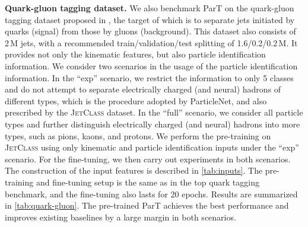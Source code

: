 \documentclass[nohyperref]{article}
\theoremstyle{plain}
\theoremstyle{definition}
\theoremstyle{remark}
\newcommand{\jetclass}{{\textsc{JetClass}}\xspace}
\begin{document}
\textbf{Quark-gluon tagging dataset.} We also benchmark ParT on the quark-gluon tagging dataset \cite{komiskePythia8QuarkGluon2019} proposed in \citet{Komiske:2018cqr}, the target of which is to separate jets initiated by quarks (signal) from those by gluons (background). This dataset also consists of 2\,M jets, with a recommended train/validation/test splitting of 1.6/0.2/0.2\,M. It provides not only the kinematic features, but also particle identification information. We consider two scenarios in the usage of the particle identification information. In the ``exp'' scenario, we restrict the information to only 5 classes and do not attempt to separate electrically charged (and neural) hadrons of different types, which is the procedure adopted by ParticleNet, and also prescribed by the \jetclass dataset. In the ``full'' scenario, we consider all particle types and further distinguish electrically charged (and neural) hadrons into more types, such as pions, kaons, and protons. 
We perform the pre-training on \jetclass using only kinematic and particle identification inputs under the ``exp'' scenario. For the fine-tuning, we then carry out experiments in both scenarios. The construction of the input features is described in \cref{tab:inputs}. 
The pre-training and fine-tuning setup is the same as in the top quark tagging benchmark, and the fine-tuning also lasts for 20 epochs. Results are summarized in \cref{tab:quark-gluon}. The pre-trained ParT achieves the best performance and improves existing baselines by a large margin in both scenarios. 
\end{document}
